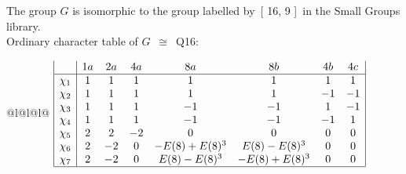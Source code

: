 \documentclass[varwidth=\maxdimen,border=10]{standalone}
\begin{document}
The group $G$ is isomorphic to the group labelled by\ [ 16, 9 ]\ in the Small Groups library.\\
Ordinary character table of $G$\ $\cong$\ Q16:\\
\begin{center}
\begin{tabular}{@{}l@{}l@{}l@{}}
\hline
\(\begin{array}{|l|ccccccc|}
  & 1a & 2a & 4a & 8a & 8b & 4b & 4c\\ \hline
\chi_{1} & 1 & 1 & 1 & 1 & 1 & 1 & 1\\
\chi_{2} & 1 & 1 & 1 & 1 & 1 & -1 & -1\\
\chi_{3} & 1 & 1 & 1 & -1 & -1 & 1 & -1\\
\chi_{4} & 1 & 1 & 1 & -1 & -1 & -1 & 1\\
\chi_{5} & 2 & 2 & -2 & 0 & 0 & 0 & 0\\
\chi_{6} & 2 & -2 & 0 & -E(8)+E(8)^{3} & E(8)-E(8)^{3} & 0 & 0\\
\chi_{7} & 2 & -2 & 0 & E(8)-E(8)^{3} & -E(8)+E(8)^{3} & 0 & 0\\
\hline
\end{array}\)\\
\end{tabular}
\end{center}
\end{document}

